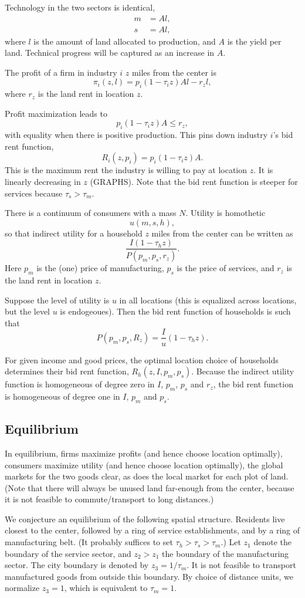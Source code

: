 \documentclass{amsart}
\theoremstyle{definition}
\theoremstyle{remark}
\numberwithin{equation}{section}
\begin{document}
Technology in the two sectors is identical,
\begin{align*}
m&=Al,\\
s&=Al,
\end{align*}
where $l$ is the amount of land allocated to production, and $A$ is the yield per land. Technical progress will be captured as an increase in $A$.

The profit of a firm in industry $i$ $z$ miles from the center is 
\[
\pi_i(z,l) = p_i(1-\tau_i z)Al - r_zl,
\]
where $r_z$ is the land rent in location $z$. 

Profit maximization leads to
\[
p_i(1-\tau_i z)A \le r_z,
\]
with equality when there is positive production. This pins down industry $i$'s bid rent function,
\[
R_i(z,p_i) = p_i(1-\tau_i z)A.
\]
This is the maximum rent the industry is willing to pay at location $z$. It is linearly decreasing in $z$ (GRAPHS). Note that the bid rent function is steeper for services because $\tau_s>\tau_m$.


There is a continuum of consumers with a mass $N$. Utility is homothetic
\[
u(m,s,h),
\]
so that indirect utility for a household $z$ miles from the center can be written as
\[
\frac{I(1-\tau_hz)}{P(p_m,p_s,r_z)}.
\]
Here $p_m$ is the (one) price of manufacturing, $p_s$ is the price of services, and $r_z$ is the land rent in location $z$.

Suppose the level of utility is $u$ in all locations (this is equalized across locations, but the level $u$ is endogeoues). Then the bid rent function of households is such that
\[
P(p_m,p_s,R_z) = \frac Iu (1-\tau_h z).
\]

For given income and good prices, the optimal location choice of households determines their bid rent function, $R_h(z,I,p_m,p_s)$. Because the indirect utility function is homogeneous of degree zero in $I$, $p_m$, $p_s$ and $r_z$, the bid rent function is homogeneous of degree one in $I$, $p_m$ and $p_s$.
\subsection{Equilibrium}
In equilibrium, firms maximize profits (and hence choose location optimally), consumers maximize utility (and hence choose location optimally), the global markets for the two goods clear, as does the local market for each plot of land. (Note that there will always be unused land far-enough from the center, because it is not feasible to commute/transport to long distances.)

We conjecture an equilibrium of the following spatial structure. Residents live closest to the center, followed by a ring of service establishments, and by a ring of manufacturing belt. (It probably suffices to set $\tau_h>\tau_s>\tau_m$.) Let $z_1$ denote the boundary of the service sector, and $z_2>z_1$ the boundary of the manufacturing sector. The city boundary is denoted by $z_3 = 1/\tau_m$. It is not feasible to transport manufactured goods from outside this boundary. By choice of distance units, we normalize $z_3=1$, which is equivalent to $\tau_m=1$.
\end{document}
